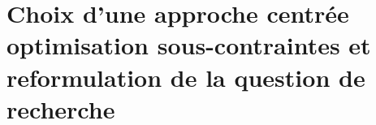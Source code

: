 \documentclass[ twoside,openright,titlepage,numbers=noenddot,headinclude,%
                footinclude=true,cleardoublepage=empty,abstractoff, %
                BCOR=5mm,paper=a4,fontsize=11pt,%
                french,american,%
                ]{scrreprt}
\begin{document}
\section{Choix d'une approche centrée optimisation sous-contraintes et reformulation de la question de recherche}
\end{document}
